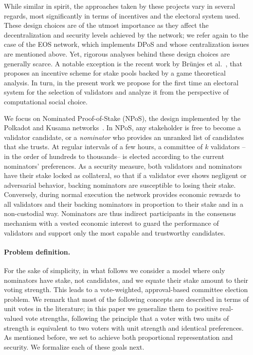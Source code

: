 While similar in spirit, the approaches taken by these projects vary in several regards, most significantly in terms of incentives and the electoral system used. These design choices are of the utmost importance as they affect the decentralization and security levels achieved by the network; we refer again to the case of the EOS network, which implements DPoS and whose centralization issues are mentioned above. 
Yet, rigorous analyses behind these design choices are generally scarce. 
A notable exception is the recent work by Br{\"u}njes et al.~\cite{brunjes2020reward}, that proposes an incentive scheme for stake pools backed by a game theoretical analysis. In turn, in the present work we propose for the first time an electoral system for the selection of validators and analyze it from the perspective of computational social choice. 

We focus on Nominated Proof-of-Stake (NPoS), the design implemented by the Polkadot and Kusama networks~\cite{burdges2020overview}. In NPoS, any stakeholder is free to become a validator candidate, or a \emph{nominator} who provides an unranked list of candidates that she trusts. At regular intervals of a few hours, a committee of $k$ validators --in the order of hundreds to thousands-- is elected according to the current nominators' preferences. 
As a security measure, both validators and nominators have their stake locked as collateral, so that if a validator ever shows negligent or adversarial behavior, backing nominators are susceptible to losing their stake. Conversely, during normal execution the network provides economic rewards to all validators and their backing nominators in proportion to their stake and in a non-custodial way. Nominators are thus indirect participants in the consensus mechanism with a vested economic interest to guard the performance of validators and support only the most capable and trustworthy candidates.

\paragraph{Problem definition.}
For the sake of simplicity, in what follows we consider a model where only nominators have stake, not candidates, and we equate their stake amount to their voting strength. This leads to a vote-weighted, approval-based committee election problem. 
We remark that most of the following concepts are described in terms of unit votes in the literature; in this paper we generalize them to positive real-valued vote strengths, following the principle that a voter with two units of strength is equivalent to two voters with unit strength and identical preferences. 
As mentioned before, we set to achieve both proportional representation and security. We formalize each of these goals next. 

